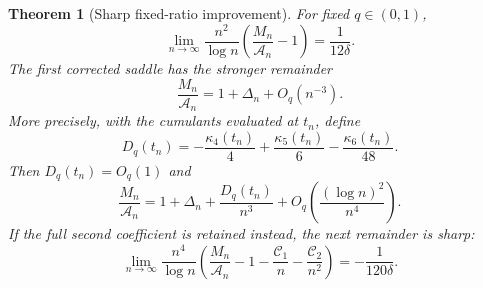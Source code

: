\documentclass[11pt,a4paper]{article}
\numberwithin{equation}{section}
\newtheorem{theorem}{Theorem}[section]
\theoremstyle{definition}\newtheorem{definition}[theorem]{Definition}
\theoremstyle{remark}\newtheorem{remark}[theorem]{Remark}
\newcommand{\Cj}{\mathscr C}
\newcommand{\A}{\mathcal A}
\begin{document}
\begin{theorem}[Sharp fixed-ratio improvement]\label{thm:geosharp}
For fixed $q\in(0,1)$,
\begin{equation}\label{eq:sharpfirst}
 \lim_{n\to\infty}\frac{n^2}{\log n}
       \left(\frac{M_n}{\A_n}-1\right)=\frac1{12\delta}.
\end{equation}
The first corrected saddle has the stronger remainder
\begin{equation}\label{eq:sharpsecond}
 \frac{M_n}{\A_n}=1+\Delta_n+O_q(n^{-3}).
\end{equation}
More precisely, with the cumulants evaluated at $t_n$, define
\begin{equation}\label{eq:D}
 D_q(t_n)=-\frac{\kappa_4(t_n)}4+\frac{\kappa_5(t_n)}6
                    -\frac{\kappa_6(t_n)}{48}.
\end{equation}
Then $D_q(t_n)=O_q(1)$ and
\begin{equation}\label{eq:Dexp}
 \frac{M_n}{\A_n}=1+\Delta_n+\frac{D_q(t_n)}{n^3}
                    +O_q\!\left(\frac{(\log n)^2}{n^4}\right).
\end{equation}
If the full second coefficient is retained instead, the next remainder is sharp:
\begin{equation}\label{eq:thirdsharp}
 \lim_{n\to\infty}\frac{n^4}{\log n}
 \left(\frac{M_n}{\A_n}-1-\frac{\Cj_1}{n}-\frac{\Cj_2}{n^2}\right)
 =-\frac1{120\delta}.
\end{equation}
\end{theorem}
\end{document}
